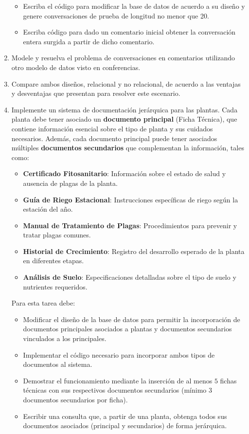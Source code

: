 \documentclass[10pt]{article}
\begin{document}
\begin{enumerate}
		\begin{itemize}
			\item Escriba el código para modificar la base de datos de acuerdo a su diseño y genere conversaciones de prueba de longitud no menor que 20.
			
			\item Escriba código para dado un comentario inicial obtener la conversación entera surgida a partir de dicho comentario.
		\end{itemize}
		
		\item Modele y resuelva el problema de conversaciones en comentarios utilizando otro modelo de datos visto en conferencias.
		
		\item Compare ambos diseños, relacional y no relacional, de acuerdo a las ventajas y desventajas que presentan para resolver este escenario.
		
		\item Implemente un sistema de documentación jerárquica para las plantas. Cada planta debe tener asociado un \textbf{documento principal} (Ficha Técnica), que contiene información esencial sobre el tipo de planta y sus cuidados necesarios. Además, cada documento principal puede tener asociados múltiples \textbf{documentos secundarios} que complementan la información, tales como:
		
		\begin{itemize}
			\item \textbf{Certificado Fitosanitario}: Información sobre el estado de salud y ausencia de plagas de la planta.
			\item \textbf{Guía de Riego Estacional}: Instrucciones específicas de riego según la estación del año.
			\item \textbf{Manual de Tratamiento de Plagas}: Procedimientos para prevenir y tratar plagas comunes.
			\item \textbf{Historial de Crecimiento}: Registro del desarrollo esperado de la planta en diferentes etapas.
			\item \textbf{Análisis de Suelo}: Especificaciones detalladas sobre el tipo de suelo y nutrientes requeridos.
		\end{itemize}
		
		Para esta tarea debe:
		
		\begin{itemize}
			\item Modificar el diseño de la base de datos para permitir la incorporación de documentos principales asociados a plantas y documentos secundarios vinculados a los principales.
			\item Implementar el código necesario para incorporar ambos tipos de documentos al sistema.
			\item Demostrar el funcionamiento mediante la inserción de al menos $5$ fichas técnicas con sus respectivos documentos secundarios (mínimo $3$ documentos secundarios por ficha).
			\item Escribir una consulta que, a partir de una planta, obtenga todos sus documentos asociados (principal y secundarios) de forma jerárquica.
		\end{itemize}
		

\end{enumerate}
\end{document}
